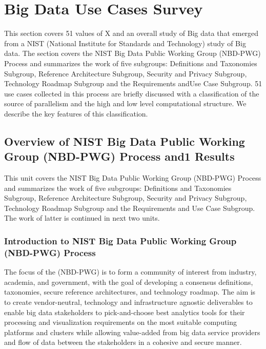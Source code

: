 

\section{Big Data Use Cases Survey}\label{big-data-use-cases-survey}

\FILENAME

This section covers 51 values of X and an overall study of Big data that
emerged from a NIST (National Institute for Standards and Technology)
study of Big data. The section covers the NIST Big Data Public Working
Group (NBD-PWG) Process and summarizes the work of five subgroups:
Definitions and Taxonomies Subgroup, Reference Architecture Subgroup,
Security and Privacy Subgroup, Technology Roadmap Subgroup and the
Requirements andUse Case Subgroup. 51 use cases collected in this
process are briefly discussed with a classification of the source of
parallelism and the high and low level computational structure. We
describe the key features of this classification.

\subsection{Overview of NIST Big Data Public Working Group (NBD-PWG)
Process and1
Results}\label{overview-of-nist-big-data-public-working-group-nbd-pwg-process-and-results}

This unit covers the NIST Big Data Public Working Group (NBD-PWG)
Process and summarizes the work of five subgroups: Definitions and
Taxonomies Subgroup, Reference Architecture Subgroup, Security and
Privacy Subgroup, Technology Roadmap Subgroup and the Requirements and
Use Case Subgroup. The work of latter is continued in next two units.




\subsubsection{Introduction to NIST Big Data Public Working Group
(NBD-PWG)
Process}\label{introduction-to-nist-big-data-public-working-group-nbd-pwg-process}

The focus of the (NBD-PWG) is to form a community of interest from
industry, academia, and government, with the goal of developing a
consensus definitions, taxonomies, secure reference architectures, and
technology roadmap. The aim is to create vendor-neutral, technology and
infrastructure agnostic deliverables to enable big data stakeholders to
pick-and-choose best analytics tools for their processing and
visualization requirements on the most suitable computing platforms and
clusters while allowing value-added from big data service providers and
flow of data between the stakeholders in a cohesive and secure manner.


